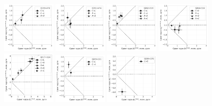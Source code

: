 \begin{figure}
 \centering
 \includegraphics[width=0.24\textwidth]{rel_vs_astrom/0133+476}
 \includegraphics[width=0.24\textwidth]{rel_vs_astrom/0151+474}
 \includegraphics[width=0.24\textwidth]{rel_vs_astrom/0202+319}
 \includegraphics[width=0.24\textwidth]{rel_vs_astrom/0204+316}
 \includegraphics[width=0.24\textwidth]{rel_vs_astrom/0217+324}
 \includegraphics[width=0.24\textwidth]{rel_vs_astrom/0229+131}
 \includegraphics[width=0.24\textwidth]{rel_vs_astrom/0239+175}

\end{figure}
